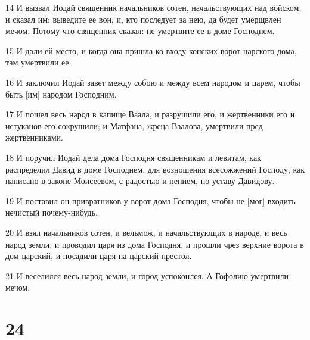 \par 14 И вызвал Иодай священник начальников сотен, начальствующих над войском, и сказал им: выведите ее вон, и, кто последует за нею, да будет умерщвлен мечом. Потому что священник сказал: не умертвите ее в доме Господнем.
\par 15 И дали ей место, и когда она пришла ко входу конских ворот царского дома, там умертвили ее.
\par 16 И заключил Иодай завет между собою и между всем народом и царем, чтобы быть [им] народом Господним.
\par 17 И пошел весь народ в капище Ваала, и разрушили его, и жертвенники его и истуканов его сокрушили; и Матфана, жреца Ваалова, умертвили пред жертвенниками.
\par 18 И поручил Иодай дела дома Господня священникам и левитам, как распределил Давид в доме Господнем, для возношения всесожжений Господу, как написано в законе Моисеевом, с радостью и пением, по уставу Давидову.
\par 19 И поставил он привратников у ворот дома Господня, чтобы не [мог] входить нечистый почему-нибудь.
\par 20 И взял начальников сотен, и вельмож, и начальствующих в народе, и весь народ земли, и проводил царя из дома Господня, и прошли чрез верхние ворота в дом царский, и посадили царя на царский престол.
\par 21 И веселился весь народ земли, и город успокоился. А Гофолию умертвили мечом.

\chapter{24}

